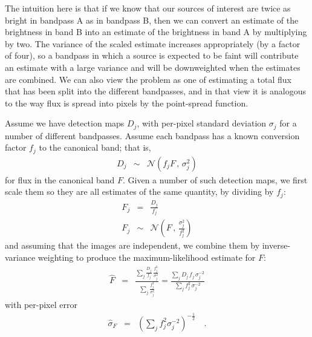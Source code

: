 \documentclass[letterpaper,preprint]{aastex62}
\newcommand{\drawnfrom}{\sim}
\newcommand{\gaussianN}{\mathcal{N}}
\newcommand{\gaussx}[2]{\gaussianN\!\left(#1 \, , \, #2\right)}
\begin{document}


The intuition here is that if we know that our sources of interest are
twice as bright in bandpass A as in bandpass B, then we can convert
an estimate of the brightness in band B into an estimate of the
brightness in band A by multiplying by two.  The variance of the
scaled estimate increases appropriately (by a factor of four), so a
bandpass in which a source is expected to be faint will contribute an
estimate with a large variance and will be downweighted when the
estimates are combined.  We can also view the problem as one of
estimating a total flux that has been split into the different
bandpasses, and in that view it is analogous to the way flux is spread
into pixels by the point-spread function.

\newcommand{\sigdj}{\sigma_{j}}

Assume we have detection maps $D_j$, with per-pixel standard deviation
$\sigdj$ for a number of different bandpasses.  Assume each
bandpass has a known conversion factor $f_j$ to the canonical band;
that is,
\begin{eqnarray}
  D_j & \drawnfrom & \gaussx{f_j F}{\sigdj^2}
\end{eqnarray}
for flux in the canonical band $F$.
%
Given a number of such detection maps, we first scale them so they are all estimates of the
same quantity, by dividing by $f_j$:
\begin{eqnarray}
  F_j & = & \frac{D_j}{f_j} \\
  F_j & \drawnfrom & \gaussx{F}{\frac{\sigdj^2}{f_j^2}}
\end{eqnarray}
and assuming that the images  are independent, we combine them by inverse-variance weighting
to produce the maximum-likelihood estimate for $F$:
\begin{eqnarray}
  \hat{F} &=& 
  \frac{\displaystyle\sum_j \frac{D_j}{f_j} \, \frac{f_j^2}{\sigdj^2}}%
       {\displaystyle\sum_j \frac{f_j^2}{\sigdj^2}}
       = 
       \frac{\displaystyle\sum_j D_j \, f_j \, \sigdj^{-2}}%
            {\displaystyle\sum_j f_j^2 \, \sigdj^{-2}}
\end{eqnarray}
with per-pixel error
\begin{eqnarray}
  \hat{\sigma}_F &=& \left( \sum_j f_j^2 \sigdj^{-2} \right)^{-\frac{1}{2}}
  \quad .
\end{eqnarray}
\end{document}
